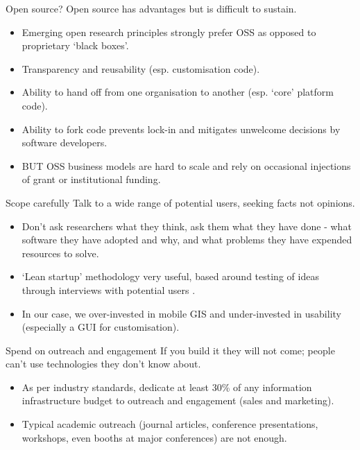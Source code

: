 \documentclass[aspectratio=169, 12pt]{beamer} %
\begin{document}
\begin{frame}{Open source?}
  Open source has advantages but is difficult to sustain.
      \begin{itemize}[label=\textbullet]
        \item Emerging open research principles strongly prefer OSS as opposed to proprietary ‘black boxes’.
        \item Transparency and reusability (esp. customisation code).
        \item Ability to hand off from one organisation to another (esp. `core' platform code).
        \item Ability to fork code prevents lock-in and mitigates unwelcome decisions by software developers.
        \item BUT OSS business models are hard to scale and rely on occasional injections of grant or institutional funding.
    \end{itemize}
\end{frame}

\begin{frame}{Scope carefully}
  Talk to a wide range of potential users, seeking facts not opinions.
      \begin{itemize}[label=\textbullet]
        \item Don’t ask researchers what they think, ask them what they have done - what software they have adopted and why, and what problems they have expended resources to solve. 
        \item ‘Lean startup’ methodology very useful, based around  testing of ideas through interviews with potential users \cite{Strategyzer_AG2019-uu}.
        \item In our case, we over-invested in mobile GIS and under-invested in usability (especially a GUI for customisation).
    \end{itemize}
\end{frame}

\begin{frame}{Spend on outreach and engagement}
  If you build it they will not come; people can't use technologies they don't know about.
      \begin{itemize}[label=\textbullet]
        \item As per industry standards, dedicate at least 30\% of any information infrastructure budget to outreach and engagement (sales and marketing). 
        \item Typical academic outreach (journal articles, conference presentations, workshops, even booths at major conferences) are not enough.
    \end{itemize}
\end{frame}
\end{document}

